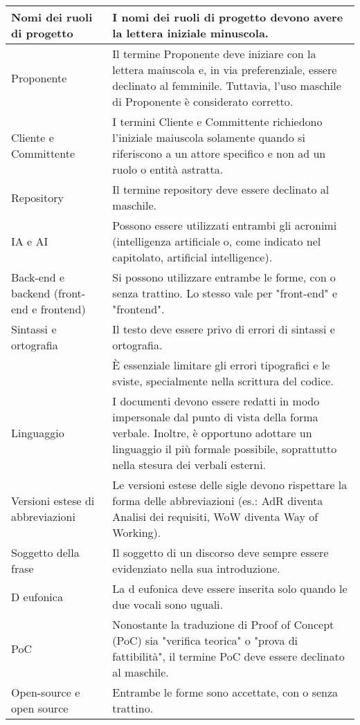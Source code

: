 \begin{adjustwidth}{-0.5cm}{-0.5cm}
\begin{longtable}{|P{4.5cm}|>{\raggedright\arraybackslash}P{9cm}|}
    Nomi dei ruoli di progetto & I nomi dei ruoli di progetto devono avere la lettera iniziale minuscola. \\
    \hline Proponente & Il termine Proponente deve iniziare con la lettera maiuscola e, in via preferenziale, essere declinato al femminile. Tuttavia, l'uso maschile di Proponente è considerato corretto.\\
    \hline Cliente e Committente & I termini Cliente e Committente richiedono l'iniziale maiuscola solamente quando si riferiscono a un attore specifico e non ad un ruolo o entità astratta.\\
		\hline Repository & Il termine repository deve essere declinato al maschile.\\
    \hline IA e AI & Possono essere utilizzati entrambi gli acronimi (intelligenza artificiale o, come indicato nel capitolato, artificial intelligence).\\
    \hline Back-end e backend (front-end e frontend) & Si possono utilizzare entrambe le forme, con o senza trattino. Lo stesso vale per "front-end" e "frontend".\\
    \hline Sintassi e ortografia & Il testo deve essere privo di errori di sintassi e ortografia. \\
    \hline {} & È essenziale limitare gli errori tipografici e le sviste, specialmente nella scrittura del codice. \\
    \hline Linguaggio & I documenti devono essere redatti in modo impersonale dal punto di vista della forma verbale. Inoltre, è opportuno adottare un linguaggio il più formale possibile, soprattutto nella stesura dei verbali esterni. \\
    \hline Versioni estese di abbreviazioni & Le versioni estese delle sigle devono rispettare la forma delle abbreviazioni (es.: AdR diventa Analisi dei requisiti, WoW diventa Way of Working). \\
		\hline Soggetto della frase & Il soggetto di un discorso deve sempre essere evidenziato nella sua introduzione. \\
		\hline D eufonica & La d eufonica deve essere inserita solo quando le due vocali sono uguali. \\
		\hline PoC & Nonostante la traduzione di Proof of Concept (PoC) sia "verifica teorica" o "prova di fattibilità", il termine PoC deve essere declinato al maschile. \\
		\hline Open-source e open source & Entrambe le forme sono accettate, con o senza trattino. \\

\end{longtable}
\end{adjustwidth}
